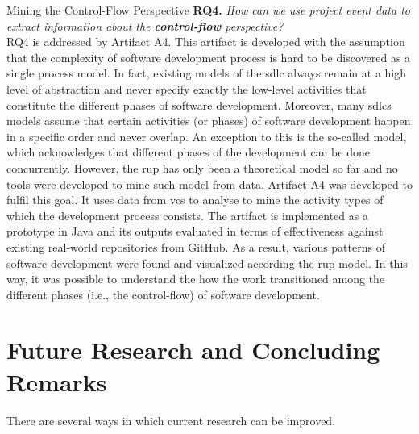 \begin{question}{Mining the Control-Flow Perspective}
	\textbf{RQ4.} \emph{How can we use project event data to extract information about the \textbf{control-flow} perspective?}\\
	 
	
	RQ4 is addressed by Artifact A4. This artifact is developed with the assumption that the complexity of software development process is hard to be discovered as a single process model. In fact, existing models of the \gls{sdlc} always remain at a high level of abstraction and never specify exactly the low-level activities that constitute the different phases of software development. Moreover, many \glspl{sdlc} models assume that certain activities (or phases) of software development happen in a specific order and never overlap. An exception to this is the so-called  model, which acknowledges that different phases of the development can be done concurrently. However, the \gls{rup} has only been a theoretical model so far and no tools were developed to mine such model from data. Artifact A4 was developed to fulfil this goal. It uses data from \gls{vcs} to analyse to mine the activity types of which the development process consists. The artifact is implemented as a prototype in Java and its outputs evaluated in terms of effectiveness against existing real-world repositories from GitHub. As a result, various patterns of software development were found and visualized according the \gls{rup} model. In this way, it was possible to understand the how the work transitioned among the different phases (i.e., the control-flow) of software development. 
\end{question}

\section{Future Research and Concluding Remarks}
\label{sec:8-future}

There are several ways in which current research can be improved. 

